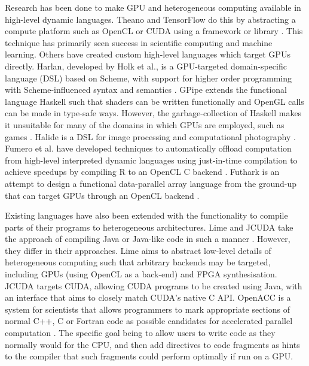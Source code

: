 \documentclass[a4paper,12pt,twoside,openright]{report}
\begin{document}
Research has been done to make GPU and heterogeneous computing available in
high-level dynamic languages. Theano and TensorFlow do this by abstracting a
compute platform such as OpenCL or CUDA using a framework or library
\cite{Theano2016} \cite{TensorFlowWhitePaper}. This technique has primarily
seen success in scientific computing and machine learning. Others have created
custom high-level languages which target GPUs directly. Harlan, developed by
Holk et al., is a GPU-targeted domain-specific language (DSL) based on Scheme,
with support for higher order programming with Scheme-influenced syntax and
semantics \cite{Harlan} \cite{HarlanAnnouncement}. GPipe extends the functional
language Haskell such that shaders can be written functionally and OpenGL calls
can be made in type-safe ways. However, the garbage-collection of Haskell makes
it unsuitable for many of the domains in which GPUs are employed, such as games
\cite{HaskellState} \cite{GPipe}. Halide is a DSL for image processing and
computational photography \cite{Halide}. Fumero et al. have developed
techniques to automatically offload computation from high-level interpreted
dynamic languages using just-in-time compilation to achieve speedups by
compiling R to an OpenCL C backend \cite{JITGPU}. Futhark is an attempt to
design a functional data-parallel array language from the ground-up that can
target GPUs through an OpenCL backend \cite{Futhark}.

Existing languages have also been extended with the functionality to compile
parts of their programs to heterogeneous architectures. Lime and JCUDA take the
approach of compiling Java or Java-like code in such a manner \cite{Lime2010}
\cite{Lime2012} \cite{JCUDA2009}. However, they differ in their approaches.
Lime aims to abstract low-level details of heterogeneous computing such that
arbitrary backends may be targeted, including GPUs (using OpenCL as a back-end)
and FPGA synthesisation. JCUDA targets CUDA, allowing CUDA programs to be
created using Java, with an interface that aims to closely match CUDA's native
C API. OpenACC is a system for scientists that allows programmers to mark
appropriate sections of normal C++, C or Fortran code as possible candidates
for accelerated parallel computation \cite{OpenACC}. The specific goal being to
allow users to write code as they normally would for the CPU, and then add
directives to code fragments as hints to the compiler that such fragments could
perform optimally if run on a GPU.

\end{document}
